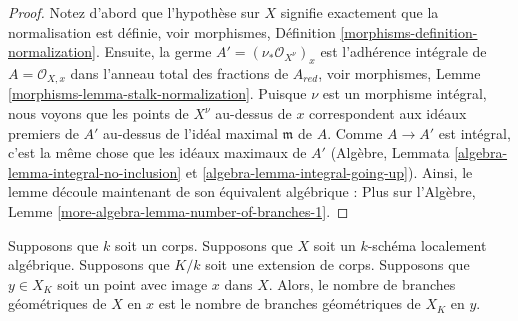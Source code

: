 \begin{proof}
Notez d'abord que l'hypothèse sur $X$ signifie
exactement que la normalisation est définie, voir
morphismes, Définition
\ref{morphisms-definition-normalization}. Ensuite, la
germe $A' = (\nu_*\mathcal{O}_{X^\nu})_x$ est
l'adhérence intégrale de $A = \mathcal{O}_{X, x}$ dans
l'anneau total des fractions de $A_{red}$, voir
morphismes, Lemme
\ref{morphisms-lemma-stalk-normalization}. Puisque $\nu$ est
un morphisme intégral, nous voyons que les points de $X^\nu$
au-dessus de $x$ correspondent aux idéaux premiers de $A'$
au-dessus de l'idéal maximal $\mathfrak m$ de $A$. Comme $A
\to A'$ est intégral, c'est la même chose que les idéaux
maximaux de $A'$ (Algèbre, Lemmata
\ref{algebra-lemma-integral-no-inclusion} et
\ref{algebra-lemma-integral-going-up}). Ainsi, le lemme découle maintenant de son
équivalent algébrique : Plus sur l'Algèbre, Lemme \ref{more-algebra-lemma-number-of-branches-1}.
\end{proof}

\begin{lemma}
\label{lemma-geometric-branches-and-change-of-fields}
Supposons que $k$ soit un corps. Supposons que $X$ soit un
$k$-schéma localement algébrique. Supposons que $K/k$ soit une
extension de corps. Supposons que $y \in X_K$ soit un point avec
image $x$ dans $X$. Alors, le nombre de branches géométriques de
$X$ en $x$ est le nombre de branches géométriques de $X_K$ en $y$.
\end{lemma}

